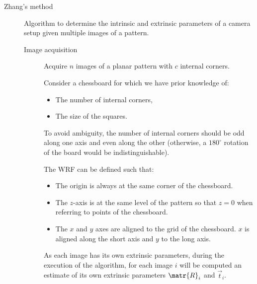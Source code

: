 \begin{description}
    \item[Zhang's method] 
        Algorithm to determine the intrinsic and extrinsic parameters of a camera setup given multiple images of a pattern.

        \begin{description}
            \item[Image acquisition] 
                Acquire $n$ images of a planar pattern with $c$ internal corners.

                Consider a chessboard for which we have prior knowledge of:
                \begin{itemize}
                    \item The number of internal corners,
                    \item The size of the squares.
                \end{itemize}

                \begin{remark}
                    To avoid ambiguity, the number of internal corners should be odd along one axis and even along the other
                    (otherwise, a $180^\circ$ rotation of the board would be indistinguishable).
                \end{remark}

                The WRF can be defined such that:
                \begin{itemize}
                    \item The origin is always at the same corner of the chessboard.
                    \item The $z$-axis is at the same level of the pattern so that $z=0$ when referring to points of the chessboard.
                    \item The $x$ and $y$ axes are aligned to the grid of the chessboard. $x$ is aligned along the short axis and $y$ to the long axis.
                \end{itemize}

                \begin{remark}
                    As each image has its own extrinsic parameters,
                    during the execution of the algorithm, for each image $i$ will be computed
                    an estimate of its own extrinsic parameters $\matr{R}_i$ and $\vec{t}_i$.
                \end{remark}


\end{description}
\end{description}

